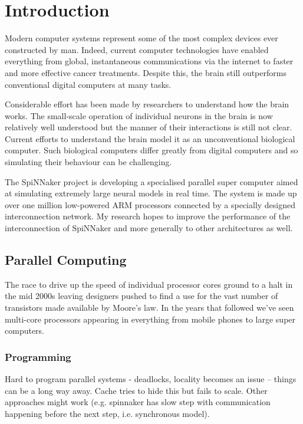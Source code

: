 \chapter{Introduction}
	
	
	Modern computer systems represent some of the most complex devices ever
	constructed by man. Indeed, current computer technologies have enabled
	everything from global, instantaneous communications via the internet to
	faster and more effective cancer treatments\cite{nassif}. Despite this, the
	brain still outperforms conventional digital computers at many tasks.
	
	Considerable effort has been made by researchers to understand how the brain
	works. The small-scale operation of individual neurons in the brain is now
	relatively well understood but the manner of their interactions is still not
	clear. Current efforts to understand the brain model it as an unconventional
	biological computer. Such biological computers differ greatly from digital
	computers and so simulating their behaviour can be challenging.
	
	The SpiNNaker project is developing a specialised parallel super computer
	aimed at simulating extremely large neural models in real time. The system is
	made up over one million low-powered ARM processors connected by a specially
	designed interconnection network. My research hopes to improve the performance
	of the interconnection of SpiNNaker and more generally to other architectures
	as well.
	
	\section{Parallel Computing}
		
		The race to drive up the speed of individual processor cores ground to a
		halt in the mid 2000s leaving designers pushed to find a use for the vast
		number of transistors made available by Moore's law. In the years that
		followed we've seen multi-core processors appearing in everything from
		mobile phones to large super computers.
		
		\subsection{Programming}
			
			Hard to program parallel systems - deadlocks, locality becomes an issue --
			things can be a long way away. Cache tries to hide this but fails to
			scale. Other approaches might work (e.g. spinnaker has slow step with
			communication happening before the next step, i.e. synchronous model).
		
